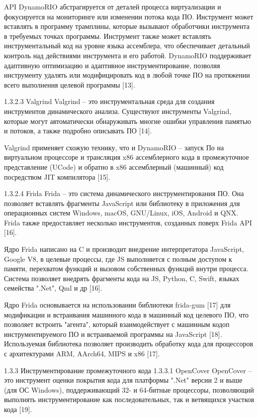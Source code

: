 API DynamoRIO абстрагируется от деталей процесса виртуализации и фокусируется на мониторинге или изменении потока кода ПО. Инструмент может вставлять в программу трамплины, которые вызывают обработчики инструмента в требуемых точках программы. Инструмент также может вставлять инструментальный код на уровне языка ассемблера, что обеспечивает детальный контроль над действиями инструмента и его работой. DynamoRIO поддерживает адаптивную оптимизацию и адаптивное инструментирование, позволяя инструменту удалять или модифицировать код в любой точке ПО на протяжении всего выполнения целевой программы [13].

1.3.2.3 Valgrind
Valgrind -- это инструментальная среда для создания инструментов динамического анализа. Существуют инструменты Valgrind, которые могут автоматически обнаруживать многие ошибки управления памятью и потоков, а также подробно описывать ПО [14].

Valgrind применяет схожую технику, что и DynamoRIO -- запуск По на виртуальном процессоре и трансляция x86 ассемблерного кода в промежуточное представление (UCode) и обратно в x86 ассемблерный (машинный) код посредством JIT компилятора [15].

1.3.2.4 Frida
Frida -- это система динамического инструментирования ПО. Она позволяет вставлять фрагменты JavaScript или библиотеку в приложения для операционных систем Windows, macOS, GNU/Linux, iOS, Android и QNX. Frida также предоставляет несколько инструментов, созданных поверх Frida API [16].

Ядро Frida написано на C и производит внедрение интерпретатора JavaScript, Google V8, в целевые процессы, где JS выполняется с полным доступом к памяти, перехватом функций и вызовом собственных функций внутри процесса. Система позволяет внедрять фрагменты кода на JS, Python, C, Swift, языках семейства ".Net", Qml и др [16].

Ядро Frida основывается на использовании библиотеки frida-gum [17] для модификации и встраивания машинного кода в машинный код целевого ПО, что позволяет встроить "агента", который взаимодействует с машинным кодоп инструментируемого ПО и встраиваемой программы на JavaScript [18]. Используемая библиотека позволяет производить обработку кода для процессоров с архитектурами ARM, AArch64, MIPS и x86 [17].

1.3.3 Инструментирование промежуточного кода
1.3.3.1 OpenCover
OpenCover -- это инструмент оценки покрытия кода для платформы ".Net" версии 2 и выше (для ОС Windows), поддерживающий 32- и 64-битные процессоры, позволяющий выполнять инструментирование как последовательных, так и ветвящихся участков кода [19].

